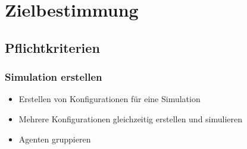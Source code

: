 \section{Zielbestimmung}

\subsection{Pflichtkriterien}

\subsubsection{Simulation erstellen}

\begin{itemize}
\item Erstellen von Konfigurationen für eine Simulation
\item Mehrere Konfigurationen gleichzeitig erstellen und simulieren
\item Agenten gruppieren
\end{itemize}



